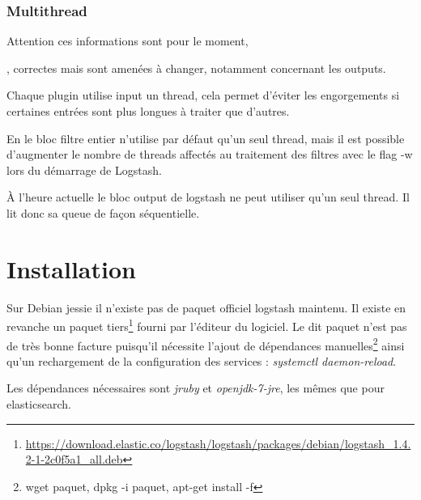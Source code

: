 \subsubsection{Multithread}
Attention ces informations sont pour le moment, \date{Jeudi 16 Avril}, correctes 
mais sont amenées à changer, notamment concernant les outputs.

Chaque plugin utilise input un \gls{thread}, cela permet d'éviter les engorgements si  
certaines entrées sont plus longues à traiter que d'autres.

En le bloc filtre entier n'utilise par défaut qu'un seul thread, mais il est possible 
d'augmenter le nombre de threads affectés au traitement des filtres avec le \gls{flag}
-w lors du démarrage de Logstash.

À l'heure actuelle le bloc output de logstash ne peut utiliser qu'un seul thread.
Il lit donc sa queue de façon séquentielle.


\section{Installation}
%
%
%
%
%
%
%
%
%




Sur Debian jessie il n'existe pas de paquet officiel logstash maintenu. Il existe 
en revanche un paquet tiers\footnote{\url{https://download.elastic.co/logstash/logstash/packages/debian/logstash\_1.4.2-1-2c0f5a1\_all.deb}} 
fourni par l'éditeur du logiciel. Le dit paquet n'est pas de très bonne facture  
puisqu'il nécessite l'ajout de dépendances manuelles\footnote{wget paquet, 
dpkg -i paquet, apt-get install -f} ainsi qu'un rechargement de 
la configuration des services : \emph{systemctl daemon-reload}.

Les dépendances nécessaires sont \emph{jruby} et \emph{openjdk-7-jre}, les mêmes 
que pour elasticsearch.


